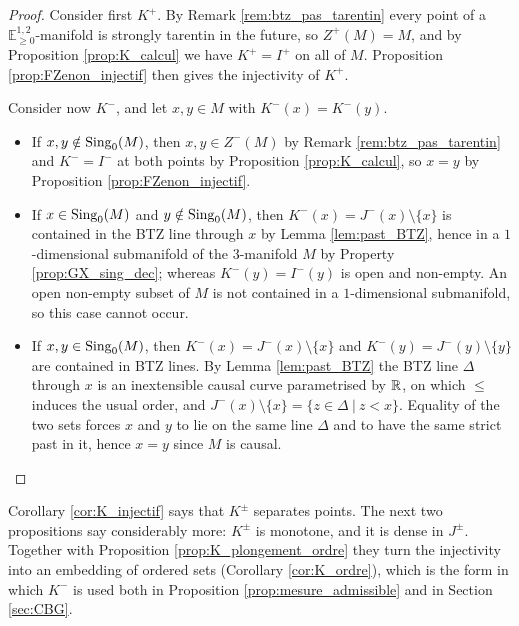 \documentclass[a4paper,twoside]{article}
\newcommand{\mass}[1]{\mathbb{E}^{1,2}_{#1}}
\begin{document}
\begin{proof}
Consider first $K^+$. By Remark \ref{rem:btz_pas_tarentin} every point of a $\mass{\geq0}$-manifold is
strongly tarentin in the future, so $Z^+(M)=M$, and by Proposition \ref{prop:K_calcul} we have
$K^+=I^+$ on all of $M$. Proposition \ref{prop:FZenon_injectif} then gives the injectivity of $K^+$.

Consider now $K^-$, and let $x,y\in M$ with $K^-(x)=K^-(y)$.
\begin{itemize}
\item If $x,y\notin \mathrm{Sing}_0(M)$, then $x,y\in Z^-(M)$ by Remark \ref{rem:btz_pas_tarentin} and
$K^-=I^-$ at both points by Proposition \ref{prop:K_calcul}, so $x=y$ by Proposition \ref{prop:FZenon_injectif}.
\item If $x\in \mathrm{Sing}_0(M)$ and $y\notin \mathrm{Sing}_0(M)$, then $K^-(x)=J^-(x)\setminus\{x\}$ is contained in the
BTZ line through $x$ by Lemma \ref{lem:past_BTZ}, hence in a $1$-dimensional submanifold of the
$3$-manifold $M$ by Property \ref{prop:GX_sing_dec}; whereas $K^-(y)=I^-(y)$ is open and non-empty.
An open non-empty subset of $M$ is not contained in a $1$-dimensional submanifold, so this case cannot occur.
\item If $x,y\in \mathrm{Sing}_0(M)$, then $K^-(x)=J^-(x)\setminus\{x\}$ and $K^-(y)=J^-(y)\setminus\{y\}$ are
contained in BTZ lines. By Lemma \ref{lem:past_BTZ} the BTZ line $\Delta$ through $x$ is an inextensible
causal curve parametrised by $\mathbb R$, on which $\leq$ induces the usual order, and
$J^-(x)\setminus\{x\}=\{z\in \Delta ~|~ z<x\}$. Equality of the two sets forces $x$ and $y$ to lie on the
same line $\Delta$ and to have the same strict past in it, hence $x=y$ since $M$ is causal.
\end{itemize}
\end{proof}

Corollary \ref{cor:K_injectif} says that $K^\pm$ separates points. The next two propositions say
considerably more: $K^\pm$ is monotone, and it is dense in $J^\pm$. Together with Proposition
\ref{prop:K_plongement_ordre} they turn the injectivity into an embedding of ordered sets
(Corollary \ref{cor:K_ordre}), which is the form in which $K^-$ is used both in Proposition
\ref{prop:mesure_admissible} and in Section \ref{sec:CBG}.
\end{document}
